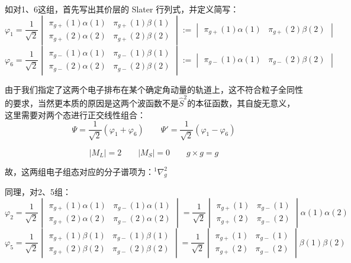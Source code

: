 如对1、6这组，首先写出其价层的 Slater 行列式，并定义简写：
\[
\varphi_1=\frac{1}{\sqrt{2}}
\begin{vmatrix}
    \pi_{g+}(1)\alpha(1) & \pi_{g+}(1)\beta(1) \\
    \pi_{g+}(2)\alpha(2) & \pi_{g+}(2)\beta(2)
\end{vmatrix}
:=
\begin{vmatrix}
    \pi_{g+}(1)\alpha(1) & \pi_{g+}(2)\beta(2)
\end{vmatrix}
\]
\[
\varphi_6=\frac{1}{\sqrt{2}}
\begin{vmatrix}
    \pi_{g-}(1)\alpha(1) & \pi_{g-}(1)\beta(1) \\
    \pi_{g-}(2)\alpha(2) & \pi_{g-}(2)\beta(2)
\end{vmatrix}
:=
\begin{vmatrix}
    \pi_{g-}(1)\alpha(1) & \pi_{g-}(2)\beta(2)
\end{vmatrix}
\]

由于我们指定了这两个电子排布在某个确定角动量的轨道上，这不符合粒子全同性的要求，当然更本质的原因是这两个波函数不是$\hat{S}^2$的本征函数，其自旋无意义，这里需要对两个态进行正交线性组合：
\[\Psi=\frac{1}{\sqrt{2}}(\varphi_1+\varphi_6) \qquad \Psi'=\frac{1}{\sqrt{2}}(\varphi_1-\varphi_6)\]

\[|M_L|=2 \qquad |M_S|=0 \qquad g \times g=g\]

故，这两组电子组态对应的分子谱项为：$^1\nabla^2_g$

同理，对2、5组：
\[
\varphi_2=\frac{1}{\sqrt{2}}
\begin{vmatrix}
    \pi_{g+}(1)\alpha(1) & \pi_{g-}(1)\alpha(1) \\
    \pi_{g+}(2)\alpha(2) & \pi_{g-}(2)\alpha(2)
\end{vmatrix}
=\frac{1}{\sqrt{2}}
\begin{vmatrix}
    \pi_{g+}(1) & \pi_{g-}(1) \\
    \pi_{g+}(2) & \pi_{g-}(2)
\end{vmatrix}
\alpha(1)\alpha(2)
\]
\[
\varphi_5=\frac{1}{\sqrt{2}}
\begin{vmatrix}
    \pi_{g+}(1)\beta(1) & \pi_{g-}(1)\beta(1) \\
    \pi_{g+}(2)\beta(2) & \pi_{g-}(2)\beta(2)
\end{vmatrix}
=\frac{1}{\sqrt{2}}
\begin{vmatrix}
    \pi_{g+}(1) & \pi_{g-}(1) \\
    \pi_{g+}(2) & \pi_{g-}(2)
\end{vmatrix}
\beta(1)\beta(2)
\]

